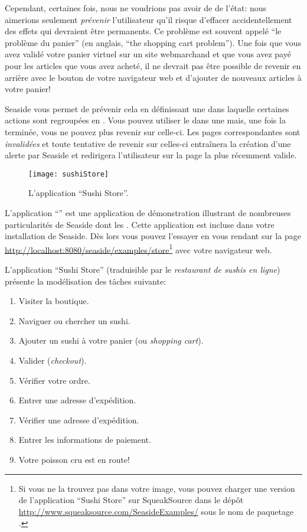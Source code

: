 \documentclass[a4paper,10pt,twoside]{book}
\begin{document}
Cependant, certaines fois, nous ne voudrions pas avoir de \backtracking
de l'état: nous aimerions seulement \emph{prévenir} l'utilisateur
qu'il risque d'effacer accidentellement des effets qui
  devraient être permanents.
Ce problème est souvent appelé ``le problème du panier'' (en anglais, ``the
shopping cart problem'').
Une fois que vous avez validé votre panier virtuel 
sur un site webmarchand
et que vous avez payé pour les articles que vous avez acheté, il ne
devrait pas être possible de revenir en arrière avec le bouton
\backbtn{} de votre navigateur web et d'ajouter de nouveaux articles à
votre panier!

Seaside vous permet de prévenir cela en définissant une \task 
dans laquelle certaines actions sont regroupées en \transactions.
Vous pouvez utiliser le \backtracking{} dans une \transaction mais,
une fois la \transaction terminée, vous ne pouvez plus revenir sur
celle-ci.
Les pages correspondantes sont \emph{invalidées} et toute tentative
de revenir sur celles-ci entraînera la création d'une alerte par
Seaside et redirigera l'utilisateur sur la page la plus récemment valide.

\begin{figure}[ht]
\begin{center}
\texttt{[image: sushiStore]}
\caption{L'application ``Sushi Store''.}
\end{center}
\end{figure}

L'application ``'' est une
application de démonstration illustrant de nombreuses particularités
de Seaside dont les \transactions.
Cette application est incluse dans votre installation de Seaside. Dès
lors vous pouvez l'essayer en vous rendant sur la page 
\url{http://localhost:8080/seaside/examples/store}\footnote{%
Si vous ne la trouvez pas dans votre image, vous pouvez charger une
version de l'application ``Sushi Store'' sur SqueakSource dans le dépôt
  \url{http://www.squeaksource.com/SeasideExamples/}
sous le nom de paquetage %
.} avec votre navigateur web.

L'application ``Sushi Store''
(traduisible par le \emph{restaurant de sushis en ligne})
présente la modélisation des tâches suivante:
\begin{enumerate}[itemsep=0pt]
  \item Visiter la boutique.
  \item Naviguer ou chercher un sushi.
  \item Ajouter un sushi à votre panier (ou \emph{shopping cart}).
  \item Valider (\emph{checkout}).
  \item Vérifier votre ordre.
  \item Entrer une adresse d'expédition.
  \item Vérifier une adresse d'expédition.
  \item Entrer les informations de paiement.
  \item Votre poisson cru est en route!
\end{enumerate}
\end{document}
